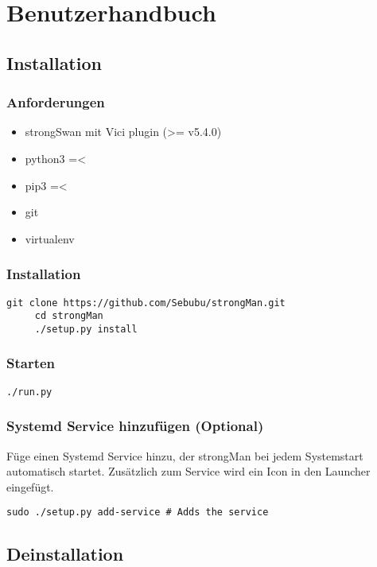 \section{Benutzerhandbuch}

\subsection{Installation}
\subsubsection{Anforderungen}
\begin{itemize}
	\item strongSwan mit Vici plugin (>= v5.4.0)
	\item python3 =<
	\item pip3 =<
	\item git
	\item virtualenv
\end{itemize}
\subsubsection{Installation}
\begin{lstlisting}[style=BashInputStyle]
	 git clone https://github.com/Sebubu/strongMan.git
	 cd strongMan
	 ./setup.py install
\end{lstlisting}

\subsubsection{Starten}
\begin{lstlisting}[style=BashInputStyle]
	 ./run.py
\end{lstlisting}

\subsubsection{Systemd Service hinzufügen (Optional)}
Füge einen Systemd Service hinzu, der strongMan bei jedem Systemstart automatisch startet. Zusätzlich zum Service wird ein Icon in den Launcher eingefügt.
\begin{lstlisting}[style=BashInputStyle]
    sudo ./setup.py add-service # Adds the service
\end{lstlisting}

\subsection{Deinstallation}
